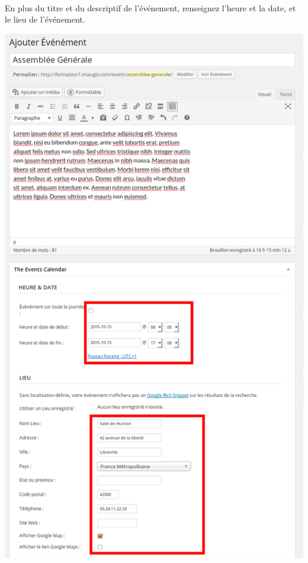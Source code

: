 \documentclass[10pt,a4paper]{article}
\begin{document}
\paragraph{}En plus du titre et du descriptif de l'événement, renseignez l'heure et la date, et le lieu de l'événement.
\begin{center}
\includegraphics[scale=0.3]{img/0198.png}
\end{center}
\end{document}
